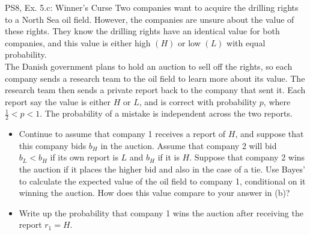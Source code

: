 \begin{frame}{PS8, Ex. 5.c: Winner's Curse}
      Two companies want to acquire the drilling rights to a North Sea oil field. However, the companies are unsure about the value of these rights. They know the drilling rights have an identical value for both companies, and this value is either high $(H)$ or low $(L)$ with equal probability.\\\smallskip
      The Danish government plans to hold an auction to sell off the rights, so each company sends a research team to the oil field to learn more about its value. The research team then sends a private report back to the company that sent it. Each report say the value is either $H$ or $L$, and is correct with probability $p$, where $\frac{1}{2} < p < 1$. The probability of a mistake is independent across the two reports.
      \vspace{-2pt}
      \begin{itemize}
        \item[(c)] Continue to assume that company 1 receives a report of $H$, and suppose that this company bids $b_H$ in the auction. Assume that company 2 will bid $b_L < b_H$ if its own report is $L$ and $b_H$ if it is $H$. Suppose that company 2 wins the auction if it places the higher bid and also in the case of a tie. Use Bayes’ to calculate the expected value of the oil field to company 1, conditional on it winning the auction. How does this value compare to your answer in (b)?
        \item[Step 1:] Write up the probability that company 1 wins the auction after receiving the report $r_1=H$.
        \end{itemize}
      \vfill\null
\end{frame}
